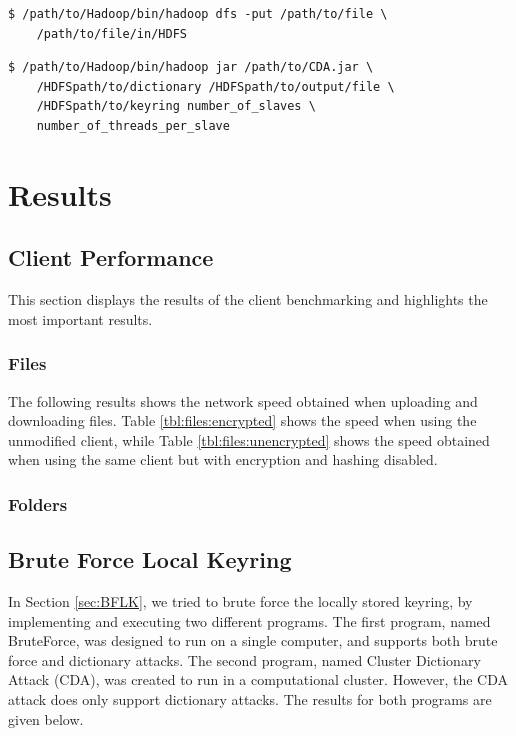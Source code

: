 \documentclass[pdftex,english,10pt,b5paper,twoside]{book}
\begin{document}
\lstset{language=bash, label=lst:cpHDFS, caption=Copying files into HDFS}
\begin{lstlisting}
$ /path/to/Hadoop/bin/hadoop dfs -put /path/to/file \
    /path/to/file/in/HDFS
\end{lstlisting}

\lstset{language=bash, label=lst:CDA, caption=Executing the CDA attack}
\begin{lstlisting}
$ /path/to/Hadoop/bin/hadoop jar /path/to/CDA.jar \
    /HDFSpath/to/dictionary /HDFSpath/to/output/file \
    /HDFSpath/to/keyring number_of_slaves \
    number_of_threads_per_slave
\end{lstlisting}
\chapter{Results}
\section{Client Performance}
This section displays the results of the client benchmarking and highlights the
most important results.

\subsection{Files} The following results shows the network speed obtained when
uploading and downloading files. Table \ref{tbl:files:encrypted} shows the
speed when using the unmodified client, while Table \ref{tbl:files:unencrypted}
shows the speed obtained when using the same client but with encryption and
hashing disabled.





\subsection{Folders}






\section{Brute Force Local Keyring}
\label{sec:R:BFLK}
In Section \ref{sec:BFLK}, we tried to brute force the locally stored keyring,
by implementing and executing two different programs. The first program, named
BruteForce, was designed to run on a single computer, and supports both brute force and
dictionary attacks. The second program, named Cluster Dictionary Attack (CDA), was created to run in a
computational cluster. However, the CDA attack does only support dictionary attacks. The results for
both programs are given below.
\end{document}

